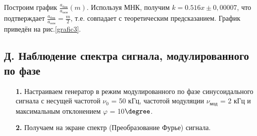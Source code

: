\documentclass[a4paper,12pt]{article}
\begin{document}
\begin{enumerate}
Построим график $\frac{a_{\text{бок}}}{a_{\text{осн}}}(m)$. Используя МНК, получим $k=0.516x\pm0,00007$, что подтверждает $\frac{a_{\text{бок}}}{a_{\text{осн}}}=\frac{m}{2}$, т.е. совпадает с теоретическим предсказанием. График приведён на рис.\ref{grafic3}.
\end{enumerate}

\newpage

\subsection*{Д. Наблюдение спектра сигнала, модулированного по фазе}

\begin{enumerate}
\item [\textbf{1.}] Настраиваем генератор в режим модулированного по фазе синусоидального сигнала с несущей частотой $\nu_0$ = 50 кГц, частотой модуляции $\nu_\text{мод}$ = 2 кГц и максимальным отклонением $\varphi$ = 10$\degree$.

\item [\textbf{2.}] Получаем на экране спектр (Преобразование Фурье) сигнала.


\end{enumerate}
\end{document}
